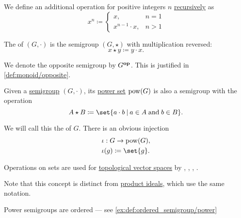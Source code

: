 \begin{definition}
\begin{thmenum}[series=def:semigroup]
     We define an additional  operation for positive integers \( n \) \hyperref[thm:omega_recursion]{recursively} as
    \begin{equation}\label{eq:def:semigroup/exponentiation}
      x^n \coloneqq \begin{cases}
        x,               &n = 1 \\
        x^{n-1} \cdot x, &n > 1
      \end{cases}
    \end{equation}

    \mimprovised The  of \( (G, \cdot) \) is the semigroup \( (G, \star) \) with multiplication reversed:
    \begin{equation*}
      x \star y \coloneqq y \cdot x.
    \end{equation*}

    We denote the opposite semigroup by \( G^\oppos \). This is justified in \cref{def:monoid/opposite}.
  \end{thmenum}
\end{definition}

\begin{definition}\label{def:power_semigroup}
  Given a \hyperref[def:semigroup]{semigroup} \( (G, \cdot) \), its \hyperref[def:basic_set_operations/power_set]{power set} \( \operatorname{pow}(G) \) is also a semigroup with the operation
  \begin{equation*}
    A \star B \coloneqq \set{ a \cdot b \given a \in A \T{and} b \in B }.
  \end{equation*}

  We will call this the  of \( G \). There is an obvious injection
  \begin{equation*}
    \begin{aligned}
      &\iota: G \to \pow(G), \\
      &\iota(g) \coloneqq \set{ g }.
    \end{aligned}
  \end{equation*}
\end{definition}
\begin{comments}
  \item Operations on sets are used for \hyperref[def:topological_vector_space]{topological vector spaces} by , , , .

  \item Note that this concept is distinct from \hyperref[def:semiring_ideal/product]{product ideals}, which use the same notation.

  \item Power semigroups are ordered --- see \cref{ex:def:ordered_semigroup/power}
\end{comments}

